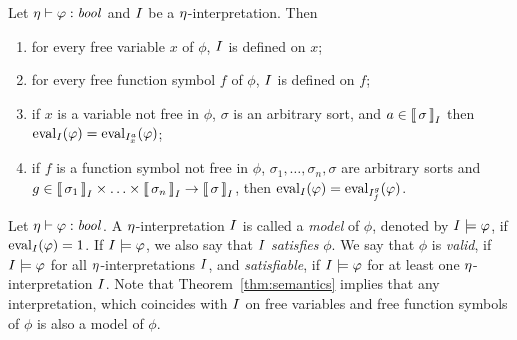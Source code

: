 \begin{theorem}\label{thm:semantics}\rm
  Let $\eta \vdash \varphi : \mathit{bool}$ and $I$ be a $\eta$-interpretation. Then
  \begin{enumerate}
    \item for every free variable $x$ of $\phi$, $I$ is defined on $x$;
    \item for every free function symbol $f$ of $\phi$, $I$ is defined on $f$;
    \item if $x$ is a variable not free in $\phi$, $\sigma$ is an arbitrary sort, and $a \in \left\llbracket\,{\sigma}\,\right\rrbracket_{I}$ then $\mathrm{eval}_{I}({\varphi}) = \mathrm{eval}_{{I}_{x}^{a}}({\varphi})$;
    \item if $f$ is a function symbol not free in $\phi$, $\sigma_1,\ldots,\sigma_n,\sigma$ are arbitrary sorts and $g \in \left\llbracket\,{\sigma_1}\,\right\rrbracket_{I} \times \ldots \times \left\llbracket\,{\sigma_n}\,\right\rrbracket_{I} \to \left\llbracket\,{\sigma}\,\right\rrbracket_{I}$, then $\mathrm{eval}_{I}({\varphi}) = \mathrm{eval}_{{I}_{f}^{g}}({\varphi})$. \QED
  \end{enumerate}
\end{theorem}

Let $\eta \vdash \varphi : \mathit{bool}$. A $\eta$-interpretation $I$ is called a \emph{model} of $\phi$, denoted by $I \models \varphi$, if $\mathrm{eval}_{I}({\varphi}) = 1$. If $I \models \varphi$, we also say that $I$ \emph{satisfies} $\phi$. We say that $\phi$ is \emph{valid}, if $I \models \varphi$ for all $\eta$-interpretations $I$, and \emph{satisfiable}, if $I \models \varphi$ for at least one $\eta$-interpretation $I$. Note that Theorem~\ref{thm:semantics} implies that any interpretation, which coincides with $I$ on free variables and free function symbols of $\phi$ is also a model of $\phi$.
